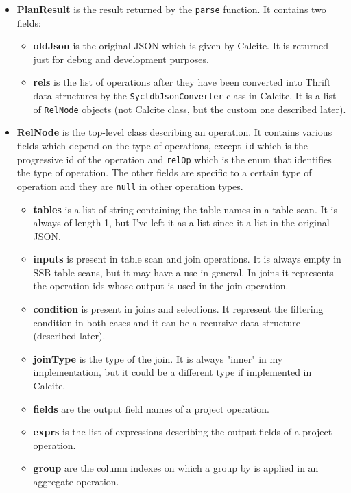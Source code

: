 \documentclass[a4paper, 10pt]{article}
\begin{document}
\begin{itemize}
    \item \textbf{PlanResult} is the result returned by the \texttt{parse} function. It contains two fields:
          \begin{itemize}
              \item \textbf{oldJson} is the original JSON which is given by Calcite. It is returned just for debug and development purposes.
              \item \textbf{rels} is the list of operations after they have been converted into Thrift data structures by the \texttt{SycldbJsonConverter} class in Calcite. It is a list of \texttt{RelNode} objects (not Calcite class, but the custom one described later).
          \end{itemize}
    \item \textbf{RelNode} is the top-level class describing an operation. It contains various fields which depend on the type of operations, except \texttt{id} which is the progressive id of the operation and \texttt{relOp} which is the enum that identifies the type of operation. The other fields are specific to a certain type of operation and they are \texttt{null} in other operation types.
          \begin{itemize}
              \item \textbf{tables} is a list of string containing the table names in a table scan. It is always of length 1, but I've left it as a list since it a list in the original JSON.
              \item \textbf{inputs} is present in table scan and join operations. It is always empty in SSB table scans, but it may have a use in general. In joins it represents the operation ids whose output is used in the join operation.
              \item \textbf{condition} is present in joins and selections. It represent the filtering condition in both cases and it can be a recursive data structure (described later).
              \item \textbf{joinType} is the type of the join. It is always "inner" in my implementation, but it could be a different type if implemented in Calcite.
              \item \textbf{fields} are the output field names of a project operation.
              \item \textbf{exprs} is the list of expressions describing the output fields of a project operation.
              \item \textbf{group} are the column indexes on which a group by is applied in an aggregate operation.

\end{itemize}
\end{itemize}
\end{document}
